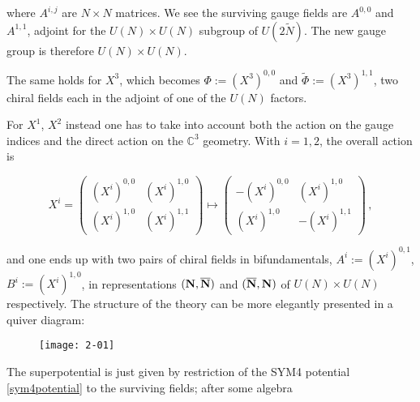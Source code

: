 where $A^{i,j}$ are $N\times N$ matrices. We see the surviving gauge fields are $A^{0,0}$ and $A^{1,1}$, adjoint for the $U(N) \times U(N)$ subgroup of $U(2\tilde N)$. The new gauge group is therefore $U(N) \times U(N)$.

The same holds for $X^3$, which becomes $\Phi := (X^3)^{0,0}$ and $\tilde \Phi := (X^3)^{1,1}$, two chiral fields each in the adjoint of one of the $U(N)$ factors.

For $X^1$, $X^2$ instead one has to take into account both the action on the gauge indices and the direct action on the $\mathbb{C}^3$ geometry. With $i=1,2$, the overall action is

\begin{equation}
	X^i = \begin{pmatrix} 
			(X^i)^{0,0} & (X^i)^{1,0} \\
			(X^i)^{1,0} & (X^i)^{1,1} 
		\end{pmatrix}\mapsto \begin{pmatrix} 
			-(X^i)^{0,0} & (X^i)^{1,0} \\
			(X^i)^{1,0} & -(X^i)^{1,1} 
		\end{pmatrix}\,,
\end{equation}

and one ends up with two pairs of chiral fields in bifundamentals, $A^i := (X^i)^{0,1}$, $B^i := (X^i)^{1,0}$, in representations $(\mathbf{N}, \overline{\mathbf{N}})$ and $(\overline{\mathbf{N}}, \mathbf{N})$ of $U(N)\times U(N)$ respectively. The structure of the theory can be more elegantly presented in a quiver diagram:

\begin{figure}[H]
	\centering
	\texttt{[image: 2-01]}
\end{figure}

The superpotential is just given by restriction of the SYM4 potential \eqref{sym4potential} to the surviving fields; after some algebra

